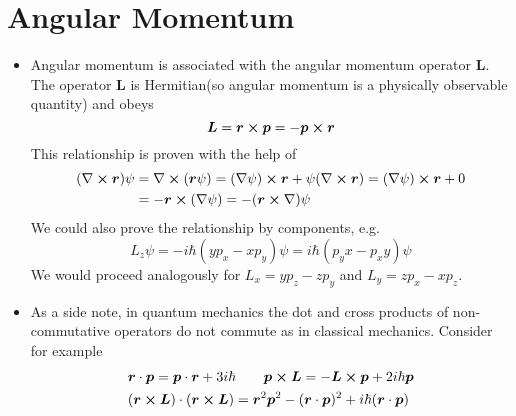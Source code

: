 \documentclass[11pt, a4paper]{article}
\renewcommand{\curl}{\nabla \cross}
\renewcommand{\grad}{\nabla}
\newcommand{\Herm}{Hermitian\xspace}
\renewcommand{\vec}[1]{\bm{#1}}  %
\renewcommand{\r}{\vec{r}}  %
\renewcommand{\L}{\vec{L}}  %
\newcommand{\p}{\psi}  %
\begin{document}
\section{Angular Momentum}
\begin{itemize}
	\item Angular momentum is associated with the angular momentum operator $ \vec{L} $. The operator $ \vec{L} $ is \Herm (so angular momentum is a physically observable quantity) and obeys
	\begin{equation*}
		\L = \r \cross \vec{p} = - \vec{p} \cross \r
	\end{equation*}
	This relationship is proven with the help of
	\begin{align*}
		(\curl \r)\p &= \curl (\r \p) = (\grad \p) \cross \r + \p (\curl \r) = (\grad \p)\cross \r + 0\\
		& = - \r \cross (\grad \p) = - (\r \cross \grad)\p
	\end{align*}
	We could also prove the relationship by components, e.g.
	\begin{equation*}
		L_{z}\p = - i\hbar(y p_{x} - xp_{y}) \p = i\hbar(p_{y}x - p_{x}y)\p
	\end{equation*}
	We would proceed analogously for $ L_{x} = yp_{z} - zp_{y} $ and $ L_{y} = zp_{x} - x p_{z} $. 
	
	\item As a side note, in quantum mechanics the dot and cross products of non-commutative operators do not commute as in classical mechanics. Consider for example
	\begin{align*}
		&\r \cdot \vec{p} = \vec{p} \cdot \r + 3i\hbar \qquad \vec{p} \cross \L = - \L \cross \vec{p} + 2i\hbar \vec{p} \\
		& (\r \cross \L)\cdot (\r \cross \L) = \r^{2}\vec{p}^{2} - (\r \cdot \vec{p})^{2} + i \hbar (\r \cdot \vec{p})
	\end{align*}
	

\end{itemize}
\end{document}
